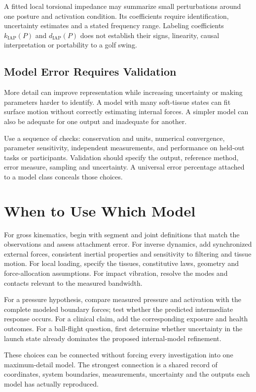 A fitted local torsional impedance may summarize small perturbations around one posture and activation condition. Its coefficients require identification, uncertainty estimates and a stated frequency range. Labeling coefficients $k_{\mathrm{IAP}}(P)$ and $d_{\mathrm{IAP}}(P)$ does not establish their signs, linearity, causal interpretation or portability to a golf swing.

\subsection{Model Error Requires Validation}

More detail can improve representation while increasing uncertainty or making parameters harder to identify. A model with many soft-tissue states can fit surface motion without correctly estimating internal forces. A simpler model can also be adequate for one output and inadequate for another.

Use a sequence of checks: conservation and units, numerical convergence, parameter sensitivity, independent measurements, and performance on held-out tasks or participants. Validation should specify the output, reference method, error measure, sampling and uncertainty. A universal error percentage attached to a model class conceals those choices.

\section{When to Use Which Model}
\label{sec:model_choice}

For gross kinematics, begin with segment and joint definitions that match the observations and assess attachment error. For inverse dynamics, add synchronized external forces, consistent inertial properties and sensitivity to filtering and tissue motion. For local loading, specify the tissues, constitutive laws, geometry and force-allocation assumptions. For impact vibration, resolve the modes and contacts relevant to the measured bandwidth.

For a pressure hypothesis, compare measured pressure and activation with the complete modeled boundary forces; test whether the predicted intermediate response occurs. For a clinical claim, add the corresponding exposure and health outcomes. For a ball-flight question, first determine whether uncertainty in the launch state already dominates the proposed internal-model refinement.

These choices can be connected without forcing every investigation into one maximum-detail model. The strongest connection is a shared record of coordinates, system boundaries, measurements, uncertainty and the outputs each model has actually reproduced.

